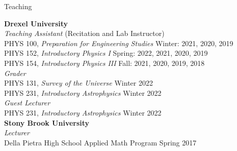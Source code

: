\documentclass{resume} %
\newcommand{\forceindent}{\leavevmode{\parindent=1em\indent}}
\begin{document}
\begin{rSection}{Teaching}

\textbf{Drexel University} \\ 
\textit{Teaching Assistant} (Recitation and Lab Instructor)\\
\forceindent PHYS 100, \textit{Preparation for Engineering Studies}  \hfill {Winter: 2021, 2020, 2019}\\
\forceindent PHYS 152, \textit{Introductory Physics I}  \hfill {Spring: 2022, 2021, 2020, 2019}\\
\forceindent PHYS 154, \textit{Introductory Physics III}  \hfill {Fall: 2021, 2020, 2019, 2018}\\
\textit{Grader} \\
\forceindent PHYS 131, \textit{Survey of the Universe} \hfill {Winter 2022}\\
\forceindent PHYS 231, \textit{Introductory Astrophysics} \hfill {Winter 2022}\\
\textit{Guest Lecturer} \\
\forceindent PHYS 231, \textit{Introductory Astrophysics} \hfill {Winter 2022}\\
\textbf{Stony Brook University} \\
\textit{Lecturer}\\
\forceindent  Della Pietra High School Applied Math Program \hfill {Spring 2017}

\end{rSection}


\newpage %
\end{document}

